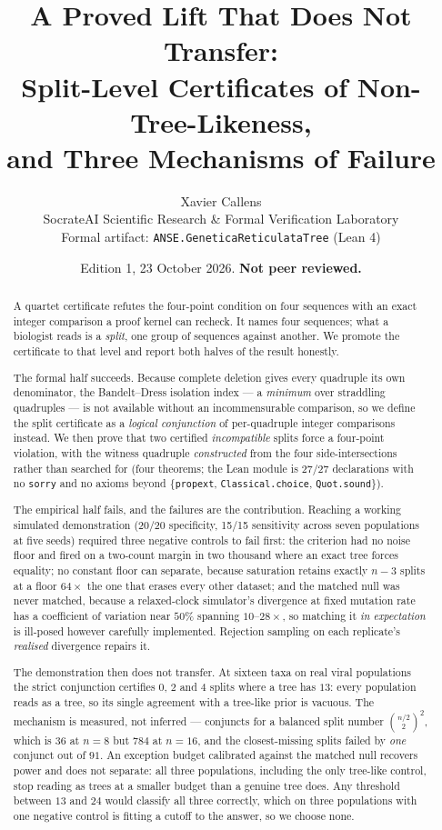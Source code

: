 \documentclass[11pt,a4paper]{article}
\title{\textbf{A Proved Lift That Does Not Transfer:\\
Split-Level Certificates of Non-Tree-Likeness,\\
and Three Mechanisms of Failure}}
\author{Xavier Callens\\
\small SocrateAI Scientific Research \& Formal Verification Laboratory\\
\small Formal artifact: \texttt{ANSE.GeneticaReticulataTree} (Lean 4)}
\date{Edition 1, 23 October 2026. \textbf{Not peer reviewed.}}
\theoremstyle{definition}
\theoremstyle{remark}
\begin{document}
\maketitle

\begin{abstract}
A quartet certificate refutes the four-point condition on four sequences with an
exact integer comparison a proof kernel can recheck. It names four sequences;
what a biologist reads is a \emph{split}, one group of sequences against
another. We promote the certificate to that level and report both halves of the
result honestly.

The formal half succeeds. Because complete deletion gives every quadruple its own
denominator, the Bandelt--Dress isolation index --- a \emph{minimum} over
straddling quadruples --- is not available without an incommensurable
comparison, so we define the split certificate as a \emph{logical conjunction} of
per-quadruple integer comparisons instead. We then prove that two certified
\emph{incompatible} splits force a four-point violation, with the witness
quadruple \emph{constructed} from the four side-intersections rather than
searched for (four theorems; the Lean module is 27/27 declarations with no
\texttt{sorry} and no axioms beyond \{\texttt{propext},
\texttt{Classical.choice}, \texttt{Quot.sound}\}).

The empirical half fails, and the failures are the contribution. Reaching a
working simulated demonstration (20/20 specificity, 15/15 sensitivity across
seven populations at five seeds) required three negative controls to fail first:
the criterion had no noise floor and fired on a two-count margin in two thousand
where an exact tree forces equality; no constant floor can separate, because
saturation retains exactly $n-3$ splits at a floor $64\times$ the one that erases
every other dataset; and the matched null was never matched, because a
relaxed-clock simulator's divergence at fixed mutation rate has a coefficient of
variation near $50\%$ spanning $10$--$28\times$, so matching it \emph{in
expectation} is ill-posed however carefully implemented. Rejection sampling on
each replicate's \emph{realised} divergence repairs it.

The demonstration then does not transfer. At sixteen taxa on real viral
populations the strict conjunction certifies $0$, $2$ and $4$ splits where a tree
has $13$: every population reads as a tree, so its single agreement with a
tree-like prior is vacuous. The mechanism is measured, not inferred --- conjuncts
for a balanced split number $\binom{n/2}{2}^2$, which is $36$ at $n=8$ but $784$
at $n=16$, and the closest-missing splits failed by \emph{one} conjunct out of
$91$. An exception budget calibrated against the matched null recovers power and
does not separate: all three populations, including the only tree-like control,
stop reading as trees at a smaller budget than a genuine tree does. Any threshold
between $13$ and $24$ would classify all three correctly, which on three
populations with one negative control is fitting a cutoff to the answer, so we
choose none.


\end{abstract}
\end{document}
